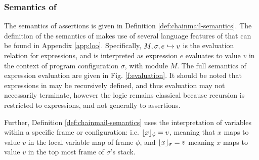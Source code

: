 \subsubsection{Semantics of \SpecO}
The semantics of \SpecO assertions is given in Definition \ref{def:chainmail-semantics}. 
The definition of the semantics of \SpecO makes use of several language features of 
\Loo that can be found in Appendix \ref{app:loo}. Specifically, $M, \sigma, e \hookrightarrow v$
is the evaluation relation for expressions, and is interpreted as expression $e$ evaluates
to value $v$ in the context of program configuration $\sigma$, with module $M$. The full
semantics of expression evaluation are given in Fig. \ref{f:evaluation}. It should 
be noted that expressions in \Loo may be recursively defined, and thus evaluation may not
necessarily terminate, however the logic remains classical because recursion is restricted
to expressions, and not generally to assertions.

Further, Definition \ref{def:chainmail-semantics} uses the interpretation of variables
within a specific frame or configuration: i.e. $\lfloor x \rfloor_{\phi} = v$, meaning that $x$ maps to
value $v$ in the local variable map of frame $\phi$, and $\lfloor x \rfloor_{\sigma} = v$ meaning $x$ 
maps to value $v$ in the top most frame of $\sigma$'s stack.

